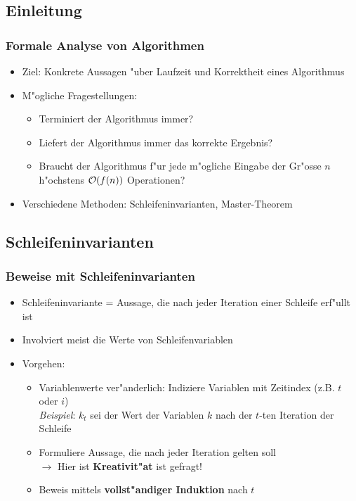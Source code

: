 \subsection{Einleitung}
\begin{frame}
  \frametitle{Formale Analyse von Algorithmen}
  \begin{itemize}
  \item Ziel: Konkrete Aussagen "uber Laufzeit und Korrektheit eines Algorithmus
  \item M"ogliche Fragestellungen:
    \begin{itemize}
    \item Terminiert der Algorithmus immer?
    \item Liefert der Algorithmus immer das korrekte Ergebnis?
    \item Braucht der Algorithmus f"ur jede m"ogliche Eingabe der Gr"osse $n$
          h"ochstens $\mathcal{O}(f(n))$ Operationen?
    \end{itemize}
  \item Verschiedene Methoden: Schleifeninvarianten, Master-Theorem
  \end{itemize}
\end{frame}

\subsection{Schleifeninvarianten}
\begin{frame}
  \frametitle{Beweise mit Schleifeninvarianten}
  \begin{itemize}
  \item Schleifeninvariante = Aussage, die nach jeder Iteration einer Schleife erf"ullt ist
  \item Involviert meist die Werte von Schleifenvariablen
  \item Vorgehen:
    \begin{itemize}
    \item Variablenwerte ver"anderlich: Indiziere Variablen mit Zeitindex (z.B. $t$ oder $i$) \\
          \emph{Beispiel}: $k_t$ sei der Wert der Variablen $k$ nach
                           der $t$-ten Iteration der Schleife
    \item Formuliere Aussage, die nach jeder Iteration gelten soll \\
          $\rightarrow$ Hier ist \textbf{Kreativit"at} ist gefragt!
    \item Beweis mittels \textbf{vollst"andiger Induktion} nach $t$
    \end{itemize}
  \end{itemize}
\end{frame}

